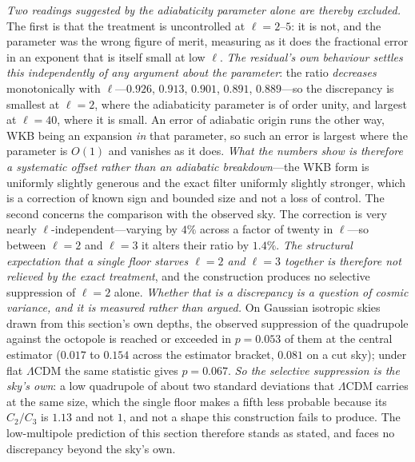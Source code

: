 \documentclass[11pt,a4paper]{article}
\theoremstyle{plain}
\theoremstyle{definition}
\theoremstyle{remark}
\begin{document}
\emph{Two readings suggested by the adiabaticity parameter alone are thereby excluded.} The first is that
the treatment is uncontrolled at $\ell=2$--$5$: it is not, and the parameter was the wrong figure of merit,
measuring as it does the fractional error in an exponent that is itself small at low $\ell$. \emph{The residual's own behaviour settles this independently of any argument about the parameter}: the ratio \emph{decreases} monotonically with $\ell$---$0.926$, $0.913$, $0.901$, $0.891$, $0.889$---so the discrepancy is smallest at $\ell=2$, where the adiabaticity parameter is of order unity, and largest at $\ell=40$, where it is small. An error of adiabatic origin runs the other way, WKB being an expansion \emph{in} that parameter, so such an error is largest where the parameter is $O(1)$ and vanishes as it does. \emph{What the numbers show is therefore a systematic offset rather than an adiabatic breakdown}---the WKB form is uniformly slightly generous and the exact filter uniformly slightly stronger, which is a correction of known sign and bounded size and not a loss of control. The second concerns the comparison with the observed sky. The correction is very nearly $\ell$-independent---varying by
$4\%$ across a factor of twenty in $\ell$---so between $\ell=2$ and $\ell=3$ it alters their ratio by $1.4\%$.
\emph{The structural expectation that a single floor starves $\ell=2$ and $\ell=3$ together is therefore not
relieved by the exact treatment}, and the construction produces no selective suppression of $\ell=2$ alone. \emph{Whether that is a discrepancy is a question of cosmic variance, and it is measured rather than argued.} On Gaussian isotropic skies drawn from this section's own depths, the observed suppression of the quadrupole against the octopole is reached or exceeded in $p=0.053$ of them at the central estimator ($0.017$ to $0.154$ across the estimator bracket, $0.081$ on a cut sky); under flat $\Lambda$CDM the same statistic gives $p=0.067$. \emph{So the selective suppression is the sky's own}: a low quadrupole of about two standard deviations that $\Lambda$CDM carries at the same size, which the single floor makes a fifth less probable because its $C_2/C_3$ is $1.13$ and not $1$, and not a shape this construction fails to produce. The low-multipole prediction of this section therefore stands as stated, and faces no discrepancy beyond the sky's own.
\end{document}
